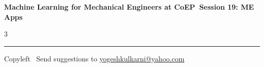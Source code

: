 \documentclass[8pt,landscape]{article}
\begin{document}
\footnotesize

\begin{center}
\Large{\textbf{Machine Learning for Mechanical Engineers at CoEP\ Session 19: ME Apps}}
\end{center}

\begin{multicols}{3}

\end{multicols}

\rule{\linewidth}{0.25pt}
\scriptsize
Copyleft \textcopyleft\  Send suggestions to
\href{http://www.yogeshkulkarni.com}{yogeshkulkarni@yahoo.com}
\end{document}
